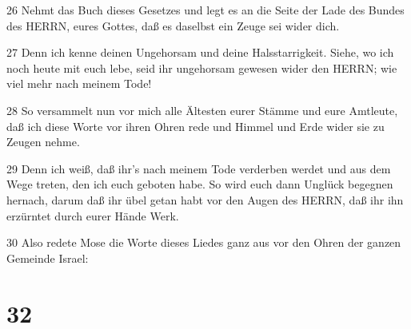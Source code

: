 \par 26 Nehmt das Buch dieses Gesetzes und legt es an die Seite der Lade des Bundes des HERRN, eures Gottes, daß es daselbst ein Zeuge sei wider dich.
\par 27 Denn ich kenne deinen Ungehorsam und deine Halsstarrigkeit. Siehe, wo ich noch heute mit euch lebe, seid ihr ungehorsam gewesen wider den HERRN; wie viel mehr nach meinem Tode!
\par 28 So versammelt nun vor mich alle Ältesten eurer Stämme und eure Amtleute, daß ich diese Worte vor ihren Ohren rede und Himmel und Erde wider sie zu Zeugen nehme.
\par 29 Denn ich weiß, daß ihr's nach meinem Tode verderben werdet und aus dem Wege treten, den ich euch geboten habe. So wird euch dann Unglück begegnen hernach, darum daß ihr übel getan habt vor den Augen des HERRN, daß ihr ihn erzürntet durch eurer Hände Werk.
\par 30 Also redete Mose die Worte dieses Liedes ganz aus vor den Ohren der ganzen Gemeinde Israel:

\chapter{32}

